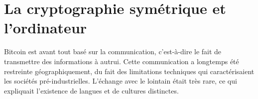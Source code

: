 %


\section*{La cryptographie symétrique et l'ordinateur}


Bitcoin est avant tout basé sur la communication, c'est-à-dire le fait de transmettre des informations à autrui. Cette communication a longtemps été restreinte géographiquement, du fait des limitations techniques qui caractérisaient les sociétés pré-industrielles. L'échange avec le lointain était très rare, ce qui expliquait l'existence de langues et de cultures distinctes.

